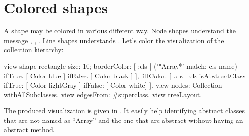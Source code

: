 \documentclass[a4paper,10pt,twoside]{book}
\begin{document}
%


%
%

\section{Colored shapes}

A shape may be colored in various different way. Node shapes understand the message , , . Line shapes understands . Let's color the visualization of the collection hierarchy:

\begin{code}{}
view shape rectangle
	size: 10;
	borderColor: [ :cls | ('*Array*' match: cls name) 
										ifTrue: [ Color blue ] 
										ifFalse: [ Color black ] ];
	fillColor: [ :cls | cls isAbstractClass ifTrue: [ Color lightGray ] ifFalse: [ Color white] ].
view nodes: Collection withAllSubclasses.
view edgesFrom: #superclass.
view treeLayout.
\end{code}

The produced visualization is given in . It easily help identifying abstract classes that are not named as ``Array'' and the one that are abstract without having an abstract method.
\end{document}
